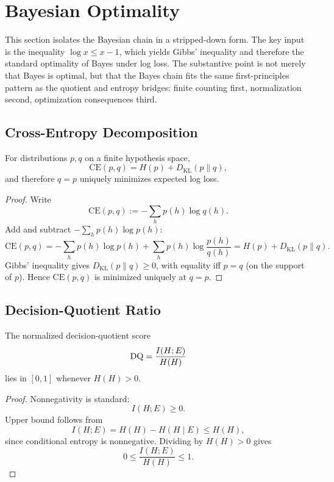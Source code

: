 \section{Bayesian Optimality}\label{sec:bayesian-optimality}

This section isolates the Bayesian chain in a stripped-down form. The key input is the inequality $\log x \le x - 1$, which yields Gibbs' inequality and therefore the standard optimality of Bayes under log loss. The substantive point is not merely that Bayes is optimal, but that the Bayes chain fits the same first-principles pattern as the quotient and entropy bridges: finite counting first, normalization second, optimization consequences third.

\subsection{Cross-Entropy Decomposition}

\begin{theorem}\label{thm:bayes-optimal}
For distributions $p,q$ on a finite hypothesis space,
\[
\mathrm{CE}(p,q)=H(p)+D_{\mathrm{KL}}(p\|q),
\]
and therefore $q=p$ uniquely minimizes expected log loss.
\end{theorem}

\begin{proof}
Write
\[
\mathrm{CE}(p,q):=-\sum_h p(h)\log q(h).
\]
Add and subtract $-\sum_h p(h)\log p(h)$:
\[
\mathrm{CE}(p,q)
=-\sum_h p(h)\log p(h)+\sum_h p(h)\log\frac{p(h)}{q(h)}
=H(p)+D_{\mathrm{KL}}(p\|q).
\]
Gibbs' inequality gives $D_{\mathrm{KL}}(p\|q)\ge 0$, with equality iff $p=q$ (on the support of $p$). Hence $\mathrm{CE}(p,q)$ is minimized uniquely at $q=p$.
\end{proof}

\subsection{Decision-Quotient Ratio}

\begin{proposition}\label{prop:dq-range}
The normalized decision-quotient score
\[
\mathrm{DQ} = \frac{I(H;E)}{H(H)}
\]
lies in $[0,1]$ whenever $H(H)>0$.
\end{proposition}

\begin{proof}
Nonnegativity is standard:
\[
I(H;E)\ge 0.
\]
Upper bound follows from
\[
I(H;E)=H(H)-H(H\mid E)\le H(H),
\]
since conditional entropy is nonnegative. Dividing by $H(H)>0$ gives
\[
0\le \frac{I(H;E)}{H(H)}\le 1.
\]
\end{proof}

